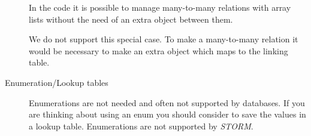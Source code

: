 \begin{description}
				                               In the code it is possible to manage many-to-many relations 
				                               with array lists without the need of an extra object between them.
				
				                               We do not support this special case. To make a many-to-many relation 
				                               it would be necessary to make an extra object which maps to the linking table.
				                               
			\item[Enumeration/Lookup tables] Enumerations are not needed and often not supported by 
				                               databases. If you are thinking about using an enum you should consider to save 
				                               the values in a lookup table. Enumerations are not supported by \textit{STORM}.
		\end{description}
		
		